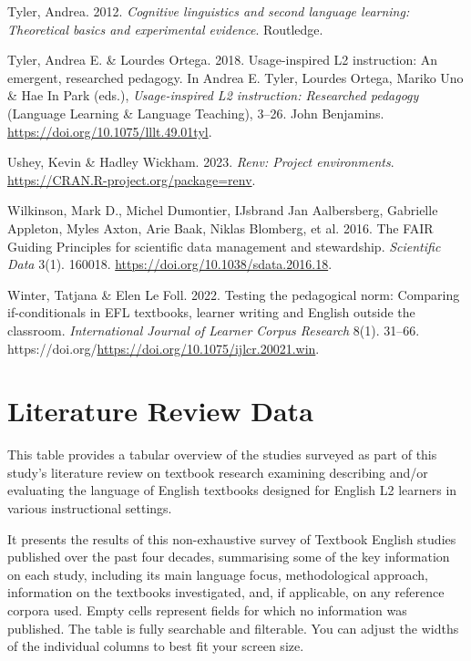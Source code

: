 \documentclass[
  letterpaper,
  DIV=11,
  numbers=noendperiod]{scrreprt}
\newlength{\cslhangindent}
\newenvironment{CSLReferences}[2] %
 {\begin{list}{}{%
  \setlength{\itemindent}{0pt}
  \setlength{\leftmargin}{0pt}
  \setlength{\parsep}{0pt}
  \ifodd #1
   \setlength{\leftmargin}{\cslhangindent}
   \setlength{\itemindent}{-1\cslhangindent}
  \fi
  \setlength{\itemsep}{#2\baselineskip}}}
 {\end{list}}
\begin{document}
\begin{CSLReferences}{1}{0}
Tyler, Andrea. 2012. \emph{Cognitive linguistics and second language
learning: Theoretical basics and experimental evidence}. Routledge.

Tyler, Andrea E. \& Lourdes Ortega. 2018. Usage-inspired {L2}
instruction: An emergent, researched pedagogy. In Andrea E. Tyler,
Lourdes Ortega, Mariko Uno \& Hae In Park (eds.), \emph{Usage-inspired
L2 instruction: Researched pedagogy} (Language Learning \& Language
Teaching), 3--26. John Benjamins.
\url{https://doi.org/10.1075/lllt.49.01tyl}.

Ushey, Kevin \& Hadley Wickham. 2023. \emph{Renv: {Project}
environments}. \url{https://CRAN.R-project.org/package=renv}.

Wilkinson, Mark D., Michel Dumontier, IJsbrand Jan Aalbersberg,
Gabrielle Appleton, Myles Axton, Arie Baak, Niklas Blomberg, et al.
2016. The FAIR Guiding Principles for scientific data management and
stewardship. \emph{Scientific Data} 3(1). 160018.
\url{https://doi.org/10.1038/sdata.2016.18}.

Winter, Tatjana \& Elen Le Foll. 2022. Testing the pedagogical norm:
Comparing if-conditionals in EFL textbooks, learner writing and
{English} outside the classroom. \emph{International Journal of Learner
Corpus Research} 8(1). 31--66.
https://doi.org/\url{https://doi.org/10.1075/ijlcr.20021.win}.

\end{CSLReferences}

\cleardoublepage
{}
{}
\appendix

\chapter{Literature Review Data}\label{literature-review-data}

This table provides a tabular overview of the studies surveyed as part
of this study's literature review on textbook research examining
describing and/or evaluating the language of English textbooks designed
for English L2 learners in various instructional settings.

It presents the results of this non-exhaustive survey of Textbook
English studies published over the past four decades, summarising some
of the key information on each study, including its main language focus,
methodological approach, information on the textbooks investigated, and,
if applicable, on any reference corpora used. Empty cells represent
fields for which no information was published. The table is fully
searchable and filterable. You can adjust the widths of the individual
columns to best fit your screen size.
\end{document}
